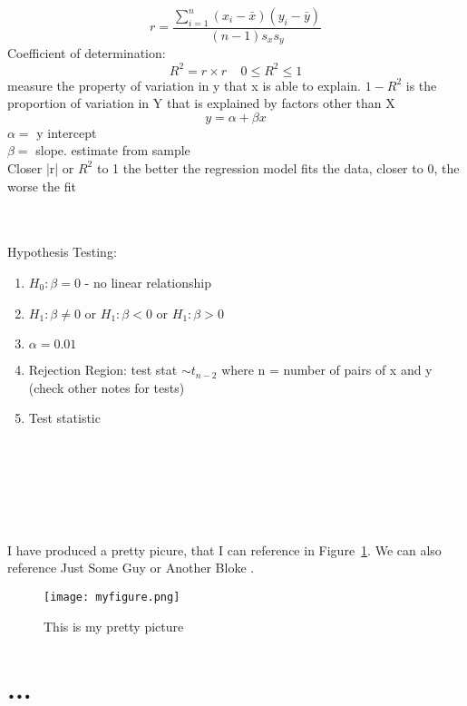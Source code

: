 \documentclass[a4paper,10pt]{article}
\begin{document}
 \[
 	r = \frac{\sum_{i=1}^n(x_i-\bar{x})(y_i-\bar{y})}{(n-1)s_xs_y}
 \]
 Coefficient of determination:
 \[
 	R^2 = r\times r \;\;\;\; 0\leq R^2\leq 1
 \]
 measure the property of variation in y that x is able to explain. $1-R^2$ is the proportion of variation in Y that is explained by factors other than X
 \[
 	y = \alpha + \beta x
 \]
 $\alpha = $ y intercept \\
 $\beta = $ slope. estimate from sample \\
 Closer |r| or $R^2$ to 1 the better the regression model fits the data, closer to 0, the worse the fit
 
 \\ \\
 Hypothesis Testing: 
 \begin{enumerate}
	\item $H_0: \beta = 0$ - no linear relationship 
	\item $H_1: \beta \neq 0$ or $H_1: \beta < 0$ or $H_1: \beta > 0$ 
	\item $\alpha = 0.01$
	\item Rejection Region: test stat $\sim t_{n-2}$ where n = number of pairs of x and y (check other notes for tests)
	\item Test statistic
\end{enumerate}

\\\\\\\\\


I have produced a pretty picure, that I can reference in Figure~\ref{fig:myfigure}.
We can also reference Just Some Guy \cite{Guy1998} or Another Bloke \cite{Bloke2005}.

\begin{figure}[ht]
  \begin{center}
    \texttt{[image: myfigure.png]}
    \caption{This is my pretty picture}
    \label{fig:myfigure}
  \end{center}
\end{figure}

\section{...}
\end{document}
